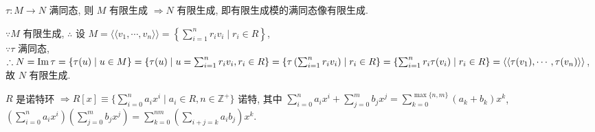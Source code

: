 \documentclass{note}
\begin{document}
\begin{cor}\label{cor for thm-5.8}
    $\tau:M\rightarrow N$ 满同态, 则 $M$ 有限生成 $\Longrightarrow N$ 有限生成, 即有限生成模的满同态像有限生成.
\end{cor}
\begin{pf}
    $\because M$ 有限生成, $\therefore$ 设 $M=\langle\langle v_1,\cdots,v_n\rangle\rangle=\left\{\sum_{i=1}^nr_iv_i\mid r_i\in R\right\}$,\\
    $\because\tau$ 满同态, $\therefore N=\operatorname{Im}\tau=\{\tau(u)\mid u\in M\}=\{\tau(u)\mid u=\sum_{i=1}^nr_iv_i,r_i\in R\}=\left\{\tau\left(\sum_{i=1}^nr_iv_i\right)\mid r_i\in R\right\}=\{\sum_{i=1}^nr_i\tau(v_i)\mid r_i\in R\}=\langle\langle\tau(v_1),\cdots,\tau(v_n)\rangle\rangle$, 故 $N$ 有限生成.
\end{pf}

\begin{thm}
    $R$ 是诺特环 $\Longrightarrow R[x]\equiv\{\sum_{i=0}^na_ix^i\mid a_i\in R,n\in\mathbb{Z}^+\}$ 诺特, 其中 $\sum_{i=0}^na_ix^i+\sum_{j=0}^mb_jx^j=\sum_{k=0}^{\max\{n,m\}}(a_k+b_k)x^k$, $\left(\sum_{i=0}^na_ix^i\right)\left(\sum_{j=0}^mb_jx^j\right)=\sum_{k=0}^{nm}\left(\sum_{i+j=k}a_ib_j\right)x^k$.
\end{thm}
\end{document}
